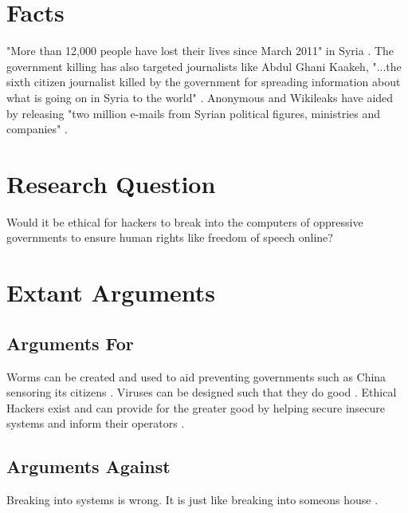 \documentclass[11pt]{article}
\begin{document}
\begin{multicols}{2}
\setcounter{page}{1}
\section{Facts}
"More than 12,000 people have lost their lives since March 2011" in Syria \cite{WhatIsGoingOn}. The government killing has also targeted journalists like Abdul Ghani Kaakeh, "...the sixth citizen journalist killed by the government for spreading information about what is going on in Syria to the world" \cite{SixthJournalistKilled}.
Anonymous and Wikileaks have aided by releasing "two million e-mails from Syrian political figures, ministries and companies" \cite{SyrianFiles}.

\section{Research Question}
Would it be ethical for hackers to break into the computers of oppressive governments to ensure human rights like freedom of speech online?

\section{Extant Arguments}
\subsection{Arguments For}

Worms can be created and used to aid preventing governments such as China sensoring its citizens \cite{GoodWormsHumanRights}.
Viruses can be designed such that they do good \cite{MidNyte}.
Ethical Hackers exist and can provide for the greater good by helping secure insecure systems and inform their operators \cite{EthicalHackingRedux}.


\subsection{Arguments Against}
Breaking into systems is wrong. It is just like breaking into someons house \cite{ComputerBreakinsEthical}.



\end{multicols}
\end{document}

